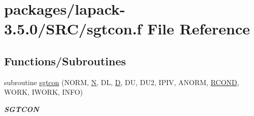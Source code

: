 \hypertarget{sgtcon_8f}{}\section{packages/lapack-\/3.5.0/\+S\+R\+C/sgtcon.f File Reference}
\label{sgtcon_8f}
\subsection*{Functions/\+Subroutines}
\begin{DoxyCompactItemize}
\item 
subroutine \hyperlink{group__realGTcomputational_ga9474585c30f5420fc243d0bd0e0e9c12}{sgtcon} (N\+O\+R\+M, \hyperlink{polmisc_8c_a0240ac851181b84ac374872dc5434ee4}{N}, D\+L, \hyperlink{odrpack_8h_a7dae6ea403d00f3687f24a874e67d139}{D}, D\+U, D\+U2, I\+P\+I\+V, A\+N\+O\+R\+M, \hyperlink{superlu__enum__consts_8h_af00a42ecad444bbda75cde1b64bd7e72a9b5c151728d8512307565994c89919d5}{R\+C\+O\+N\+D}, W\+O\+R\+K, I\+W\+O\+R\+K, I\+N\+F\+O)
\begin{DoxyCompactList}\small\item\em {\bfseries S\+G\+T\+C\+O\+N} \end{DoxyCompactList}\end{DoxyCompactItemize}
